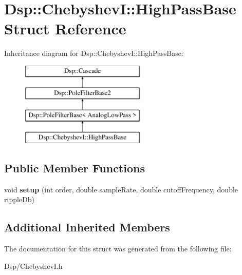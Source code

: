 \hypertarget{structDsp_1_1ChebyshevI_1_1HighPassBase}{\section{Dsp\-:\-:Chebyshev\-I\-:\-:High\-Pass\-Base Struct Reference}
\label{structDsp_1_1ChebyshevI_1_1HighPassBase}
}
Inheritance diagram for Dsp\-:\-:Chebyshev\-I\-:\-:High\-Pass\-Base\-:\begin{figure}[H]
\begin{center}
\leavevmode
\includegraphics[height=4.000000cm]{structDsp_1_1ChebyshevI_1_1HighPassBase}
\end{center}
\end{figure}
\subsection*{Public Member Functions}
\begin{DoxyCompactItemize}
\item 
\hypertarget{structDsp_1_1ChebyshevI_1_1HighPassBase_aff8ea493e5ce69cddc281dfeef492a91}{void {\bfseries setup} (int order, double sample\-Rate, double cutoff\-Frequency, double ripple\-Db)}\label{structDsp_1_1ChebyshevI_1_1HighPassBase_aff8ea493e5ce69cddc281dfeef492a91}

\end{DoxyCompactItemize}
\subsection*{Additional Inherited Members}


The documentation for this struct was generated from the following file\-:\begin{DoxyCompactItemize}
\item 
Dsp/Chebyshev\-I.\-h\end{DoxyCompactItemize}
